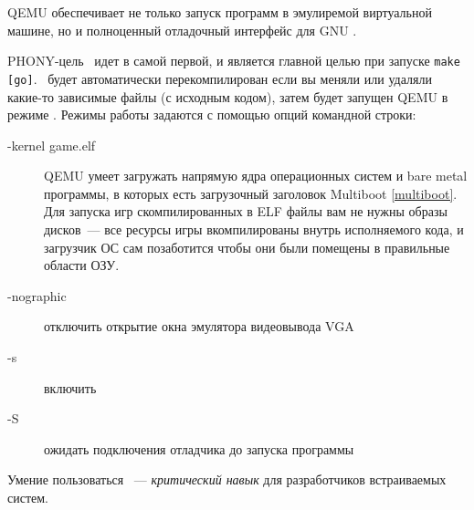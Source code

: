 \label{qemudebug}

QEMU обеспечивает не только запуск  программ в эмулиремой
виртуальной машине, но и полноценный отладочный интерфейс для GNU .


PHONY-цель \ идет в  самой первой, и является главной
целью при запуске \verb|make [go]|. \ будет автоматически
перекомпилирован если вы меняли или удаляли какие-то зависимые файлы (с
исходным кодом), затем будет запущен QEMU в режиме .
Режимы работы задаются с помощью опций командной строки:

\begin{description}
\item[-kernel game.elf] QEMU умеет загружать напрямую ядра операционных систем и
bare metal программы, в которых есть загрузочный заголовок Multiboot
\ref{multiboot}. Для запуска игр скомпилированных в ELF файлы вам не нужны
образы дисков\ --- все ресурсы игры вкомпилированы внутрь исполняемого
кода, и загрузчик ОС сам позаботится чтобы они были помещены в правильные
области ОЗУ.
\item[-nographic] отключить открытие окна эмулятора видеовывода VGA
\item[-s] включить 
\item[-S] ожидать подключения отладчика до запуска программы
\end{description}

\begin{framed}\noindent
Умение пользоваться \ --- \emph{критический навык} для
разработчиков встраиваемых систем.
\end{framed}
